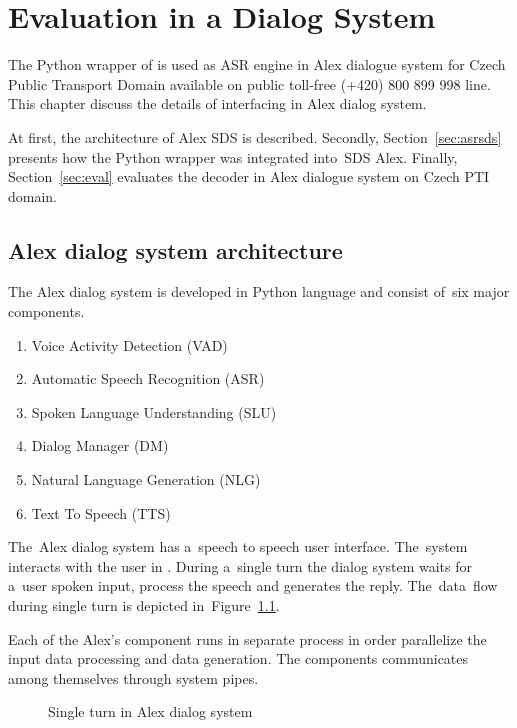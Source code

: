 \chapter{Evaluation in a Dialog System}
\label{cha:integration}

The Python wrapper of  is used as \ac{ASR} engine in Alex dialogue system for Czech Public Transport Domain available on public toll-free (+420) 800 899 998 line.
This chapter discuss the details of interfacing  in Alex dialog system.

At first, the architecture of Alex \ac{SDS} is described.
Secondly, Section~\ref{sec:asrsds} presents how the Python wrapper  was integrated into~\ac{SDS} Alex.
Finally, Section~\ref{sec:eval} evaluates the decoder in Alex dialogue system on Czech \ac{PTI} domain. 

\section{Alex dialog system architecture} 
\label{sec:arch}
The Alex dialog system is developed in Python language and consist of~six major components. 
\begin{enumerate}
    \item Voice Activity Detection (VAD)
    \item Automatic Speech Recognition (ASR) 
    \item Spoken Language Understanding (SLU)
    \item Dialog Manager (DM)
    \item Natural Language Generation (NLG)
    \item Text To Speech (TTS)
\end{enumerate}
The~Alex dialog system has a~speech to speech user interface. 
The~system interacts with the user in . 
During a~single turn the dialog system waits for a~user spoken input, process the speech and generates the reply.
The~data~flow during single turn is depicted in~Figure~\ref{fig:dialog_system}.

Each of the Alex's component runs in separate process in order parallelize the input data processing and data generation.
The components communicates among themselves through system pipes.

\begin{figure}
    \begin{center}
    
    \caption{Single turn in Alex dialog system}
    \label{fig:dialog_system} 
    \end{center}
\end{figure}


